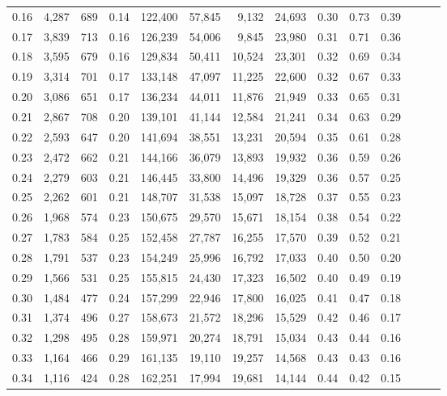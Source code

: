 \begin{tabular}{rrrrrrrrrrrrrr}
0.16 &   4,287 &  689 &  0.14 &  122,400 &   57,845 &   9,132 &  24,693 &  0.30 &  0.73 &      0.39 \\
0.17 &   3,839 &  713 &  0.16 &  126,239 &   54,006 &   9,845 &  23,980 &  0.31 &  0.71 &      0.36 \\
0.18 &   3,595 &  679 &  0.16 &  129,834 &   50,411 &  10,524 &  23,301 &  0.32 &  0.69 &      0.34 \\
0.19 &   3,314 &  701 &  0.17 &  133,148 &   47,097 &  11,225 &  22,600 &  0.32 &  0.67 &      0.33 \\
0.20 &   3,086 &  651 &  0.17 &  136,234 &   44,011 &  11,876 &  21,949 &  0.33 &  0.65 &      0.31 \\
0.21 &   2,867 &  708 &  0.20 &  139,101 &   41,144 &  12,584 &  21,241 &  0.34 &  0.63 &      0.29 \\
0.22 &   2,593 &  647 &  0.20 &  141,694 &   38,551 &  13,231 &  20,594 &  0.35 &  0.61 &      0.28 \\
0.23 &   2,472 &  662 &  0.21 &  144,166 &   36,079 &  13,893 &  19,932 &  0.36 &  0.59 &      0.26 \\
0.24 &   2,279 &  603 &  0.21 &  146,445 &   33,800 &  14,496 &  19,329 &  0.36 &  0.57 &      0.25 \\
0.25 &   2,262 &  601 &  0.21 &  148,707 &   31,538 &  15,097 &  18,728 &  0.37 &  0.55 &      0.23 \\
0.26 &   1,968 &  574 &  0.23 &  150,675 &   29,570 &  15,671 &  18,154 &  0.38 &  0.54 &      0.22 \\
0.27 &   1,783 &  584 &  0.25 &  152,458 &   27,787 &  16,255 &  17,570 &  0.39 &  0.52 &      0.21 \\
0.28 &   1,791 &  537 &  0.23 &  154,249 &   25,996 &  16,792 &  17,033 &  0.40 &  0.50 &      0.20 \\
0.29 &   1,566 &  531 &  0.25 &  155,815 &   24,430 &  17,323 &  16,502 &  0.40 &  0.49 &      0.19 \\
0.30 &   1,484 &  477 &  0.24 &  157,299 &   22,946 &  17,800 &  16,025 &  0.41 &  0.47 &      0.18 \\
0.31 &   1,374 &  496 &  0.27 &  158,673 &   21,572 &  18,296 &  15,529 &  0.42 &  0.46 &      0.17 \\
0.32 &   1,298 &  495 &  0.28 &  159,971 &   20,274 &  18,791 &  15,034 &  0.43 &  0.44 &      0.16 \\
0.33 &   1,164 &  466 &  0.29 &  161,135 &   19,110 &  19,257 &  14,568 &  0.43 &  0.43 &      0.16 \\
0.34 &   1,116 &  424 &  0.28 &  162,251 &   17,994 &  19,681 &  14,144 &  0.44 &  0.42 &      0.15 \\

\end{tabular}
